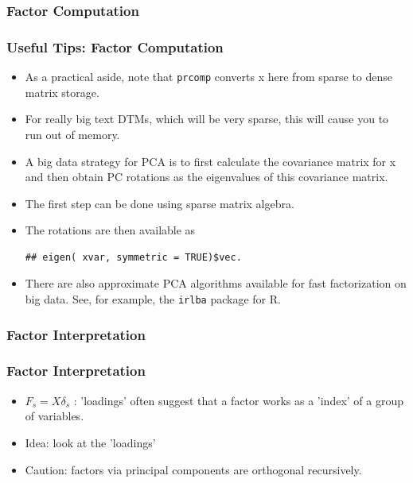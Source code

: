 \documentclass[
  shownotes,
  xcolor={svgnames},
  hyperref={colorlinks,citecolor=DarkBlue,linkcolor=DarkRed,urlcolor=DarkBlue}
  , aspectratio=169]{beamer}
\begin{document}
\subsubsection{Factor Computation}
\begin{frame}[fragile]
\frametitle{Useful Tips: Factor Computation}


\begin{itemize}


\item As a practical aside, note that \texttt{prcomp} converts x here from sparse to dense matrix storage.

\item For really big text DTMs, which will be very sparse, this will cause you to run out of memory. 

\item A big data strategy for PCA is to first calculate the covariance matrix for x and then obtain PC rotations as the eigenvalues of this covariance matrix. 

\item The first step can be done using sparse matrix algebra. 

\item The rotations are then available as

\begin{verbatim}
## eigen( xvar, symmetric = TRUE)$vec. 
\end{verbatim}


\item There are also approximate PCA algorithms available for fast factorization on big data. See, for example, the \texttt{irlba} package for R. 
\end{itemize}
\end{frame}

\subsubsection{Factor Interpretation}
\begin{frame}
\frametitle{Factor Interpretation}

\begin{itemize}
\item $F_s = X\delta_s$ : 'loadings' often suggest that a factor works as a 'index' of a group of variables.
\bigskip
\item Idea: look at the 'loadings'
\bigskip
\item Caution: factors via principal components are orthogonal recursively.
\end{itemize}


\end{frame}
\end{document}
